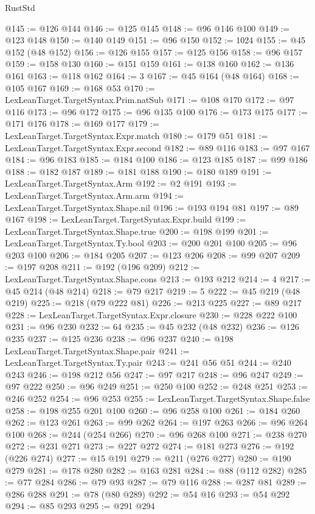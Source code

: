 \begin{lexlean}{RustStd}
\begin{coremodule}
@145 := @126 @144
@146 := @125 @145
@148 := @96 @146 @100
@149 := @123 @148
@150 := @140 @149
@151 := @96 @150
@152 := 1024
@155 := @45 @152 (@48 @152)
@156 := @126 @155
@157 := @125 @156
@158 := @96 @157
@159 := @158 @130
@160 := @151 @159
@161 := @138 @160
@162 := @136 @161
@163 := @118 @162
@164 := 3
@167 := @45 @164 (@48 @164)
@168 := @105 @167
@169 := @168 @53
@170 := LexLeanTarget.TargetSyntax.Prim.natSub
@171 := @108 @170
@172 := @97 @116
@173 := @96 @172
@175 := @96 @135 @100
@176 := @173 @175
@177 := @171 @176
@178 := @169 @177
@179 := LexLeanTarget.TargetSyntax.Expr.match
@180 := @179 @51
@181 := LexLeanTarget.TargetSyntax.Expr.second
@182 := @89 @116
@183 := @97 @167
@184 := @96 @183
@185 := @184 @100
@186 := @123 @185
@187 := @99 @186
@188 := @182 @187
@189 := @181 @188
@190 := @180 @189
@191 := LexLeanTarget.TargetSyntax.Arm
@192 := @2 @191
@193 := LexLeanTarget.TargetSyntax.Arm.arm
@194 := LexLeanTarget.TargetSyntax.Shape.nil
@196 := @193 @194 @81
@197 := @89 @167
@198 := LexLeanTarget.TargetSyntax.Expr.build
@199 := LexLeanTarget.TargetSyntax.Shape.true
@200 := @198 @199
@201 := LexLeanTarget.TargetSyntax.Ty.bool
@203 := @200 @201 @100
@205 := @96 @203 @100
@206 := @184 @205
@207 := @123 @206
@208 := @99 @207
@209 := @197 @208
@211 := @192 (@196 @209)
@212 := LexLeanTarget.TargetSyntax.Shape.cons
@213 := @193 @212
@214 := 4
@217 := @45 @214 (@48 @214)
@218 := @79 @217
@219 := 5
@222 := @45 @219 (@48 @219)
@225 := @218 (@79 @222 @81)
@226 := @213 @225
@227 := @89 @217
@228 := LexLeanTarget.TargetSyntax.Expr.closure
@230 := @228 @222 @100
@231 := @96 @230
@232 := 64
@235 := @45 @232 (@48 @232)
@236 := @126 @235
@237 := @125 @236
@238 := @96 @237
@240 := @198 LexLeanTarget.TargetSyntax.Shape.pair
@241 := LexLeanTarget.TargetSyntax.Ty.pair
@243 := @241 @56 @51
@244 := @240 @243
@246 := @198 @212 @56
@247 := @97 @217
@248 := @96 @247
@249 := @97 @222
@250 := @96 @249
@251 := @250 @100
@252 := @248 @251
@253 := @246 @252
@254 := @96 @253
@255 := LexLeanTarget.TargetSyntax.Shape.false
@258 := @198 @255 @201 @100
@260 := @96 @258 @100
@261 := @184 @260
@262 := @123 @261
@263 := @99 @262
@264 := @197 @263
@266 := @96 @264 @100
@268 := @244 (@254 @266)
@270 := @96 @268 @100
@271 := @238 @270
@272 := @231 @271
@273 := @227 @272
@274 := @181 @273
@276 := @192 (@226 @274)
@277 := @15 @191
@279 := @211 (@276 @277)
@280 := @190 @279
@281 := @178 @280
@282 := @163 @281
@284 := @88 (@112 @282)
@285 := @77 @284
@286 := @79 @93
@287 := @79 @116
@288 := @287 @81
@289 := @286 @288
@291 := @78 (@80 @289)
@292 := @54 @16
@293 := @54 @292
@294 := @85 @293
@295 := @291 @294

\end{coremodule}
\end{lexlean}

